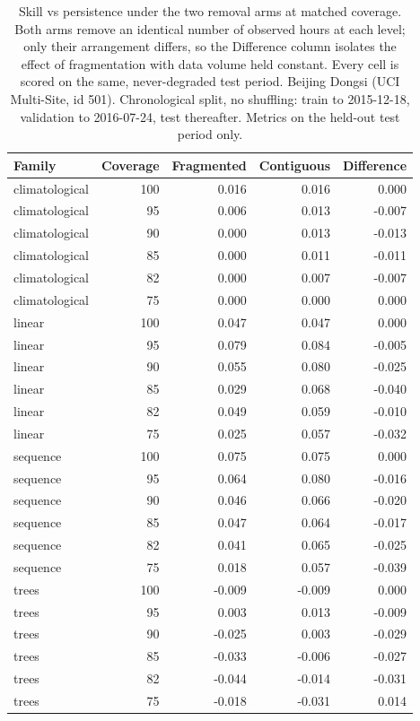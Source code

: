 \begin{table}[htbp]
\caption{Skill vs persistence under the two removal arms at matched coverage. Both arms remove an identical number of observed hours at each level; only their arrangement differs, so the Difference column isolates the effect of fragmentation with data volume held constant. Every cell is scored on the same, never-degraded test period. Beijing Dongsi (UCI Multi-Site, id 501). Chronological split, no shuffling: train to 2015-12-18, validation to 2016-07-24, test thereafter. Metrics on the held-out test period only.}
\label{tab:ablation_arm_gap}
\begin{tabular}{lrrrr}
\toprule
Family & Coverage & Fragmented & Contiguous & Difference \\
\midrule
climatological & 100 & 0.016 & 0.016 & 0.000 \\
climatological & 95 & 0.006 & 0.013 & -0.007 \\
climatological & 90 & 0.000 & 0.013 & -0.013 \\
climatological & 85 & 0.000 & 0.011 & -0.011 \\
climatological & 82 & 0.000 & 0.007 & -0.007 \\
climatological & 75 & 0.000 & 0.000 & 0.000 \\
linear & 100 & 0.047 & 0.047 & 0.000 \\
linear & 95 & 0.079 & 0.084 & -0.005 \\
linear & 90 & 0.055 & 0.080 & -0.025 \\
linear & 85 & 0.029 & 0.068 & -0.040 \\
linear & 82 & 0.049 & 0.059 & -0.010 \\
linear & 75 & 0.025 & 0.057 & -0.032 \\
sequence & 100 & 0.075 & 0.075 & 0.000 \\
sequence & 95 & 0.064 & 0.080 & -0.016 \\
sequence & 90 & 0.046 & 0.066 & -0.020 \\
sequence & 85 & 0.047 & 0.064 & -0.017 \\
sequence & 82 & 0.041 & 0.065 & -0.025 \\
sequence & 75 & 0.018 & 0.057 & -0.039 \\
trees & 100 & -0.009 & -0.009 & 0.000 \\
trees & 95 & 0.003 & 0.013 & -0.009 \\
trees & 90 & -0.025 & 0.003 & -0.029 \\
trees & 85 & -0.033 & -0.006 & -0.027 \\
trees & 82 & -0.044 & -0.014 & -0.031 \\
trees & 75 & -0.018 & -0.031 & 0.014 \\
\bottomrule
\end{tabular}
\end{table}
